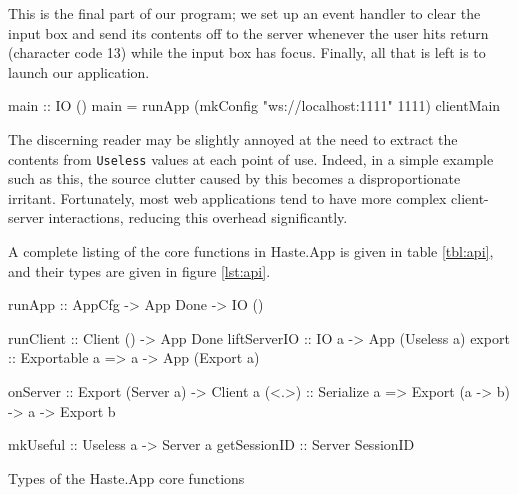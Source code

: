 \documentclass[preprint]{sigplanconf}
\begin{document}

This is the final part of our program; we set up an event handler to clear the
input box and send its contents off to the server whenever the user hits return
(character code 13) while the input box has focus. Finally, all that is left
is to launch our application.

\begin{code}
main :: IO ()
main =
  runApp (mkConfig "ws://localhost:1111" 1111)
         clientMain
\end{code}

The discerning reader may be slightly annoyed at the need to extract the
contents from \lstinline!Useless! values at each point of use. Indeed, in a
simple example such as this, the source clutter caused by this becomes a
disproportionate irritant. Fortunately, most web applications tend to have
more complex client-server interactions, reducing this overhead significantly.

A complete listing of the core functions in Haste.App is given in table
\ref{tbl:api}, and their types are given in figure \ref{lst:api}.

\begin{listingfloat}
\begin{code}
runApp       :: AppCfg -> App Done -> IO ()

runClient    :: Client () -> App Done
liftServerIO :: IO a -> App (Useless a)
export       :: Exportable a
             => a -> App (Export a)

onServer     :: Export (Server a) -> Client a
(<.>)        :: Serialize a
             => Export (a -> b) -> a -> Export b

mkUseful     :: Useless a -> Server a
getSessionID :: Server SessionID
\end{code}
\caption{Types of the Haste.App core functions}
\label{lst:api}
\end{listingfloat}
\end{document}
